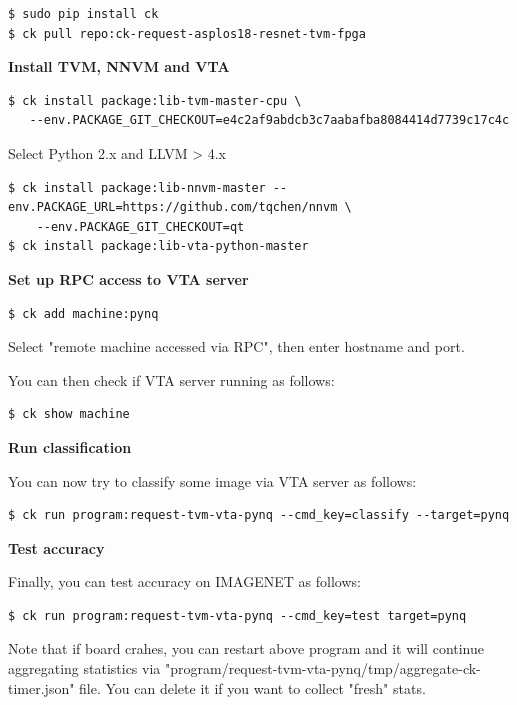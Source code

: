 \documentclass[sigconf]{acmart}
\begin{document}
\begin{verbatim}
$ sudo pip install ck
$ ck pull repo:ck-request-asplos18-resnet-tvm-fpga
\end{verbatim}

\textbf{Install TVM, NNVM and VTA}

\begin{verbatim}
$ ck install package:lib-tvm-master-cpu \
   --env.PACKAGE_GIT_CHECKOUT=e4c2af9abdcb3c7aabafba8084414d7739c17c4c
\end{verbatim}

Select Python 2.x and LLVM > 4.x

\begin{verbatim}
$ ck install package:lib-nnvm-master --env.PACKAGE_URL=https://github.com/tqchen/nnvm \
    --env.PACKAGE_GIT_CHECKOUT=qt
$ ck install package:lib-vta-python-master
\end{verbatim}

\textbf{Set up RPC access to VTA server}

\begin{verbatim}
$ ck add machine:pynq
\end{verbatim}

Select "remote machine accessed via RPC", then enter hostname and port.

You can then check if VTA server running as follows:

\begin{verbatim}
$ ck show machine
\end{verbatim}

\textbf{Run classification}

You can now try to classify some image via VTA server as follows:

\begin{verbatim}
$ ck run program:request-tvm-vta-pynq --cmd_key=classify --target=pynq
\end{verbatim}

\textbf{Test accuracy}

Finally, you can test accuracy on IMAGENET as follows:

\begin{verbatim}
$ ck run program:request-tvm-vta-pynq --cmd_key=test target=pynq
\end{verbatim}

Note that if board crahes, you can restart above program and it will continue aggregating statistics
via "program/request-tvm-vta-pynq/tmp/aggregate-ck-timer.json" file. 
You can delete it if you want to collect "fresh" stats.
\end{document}
